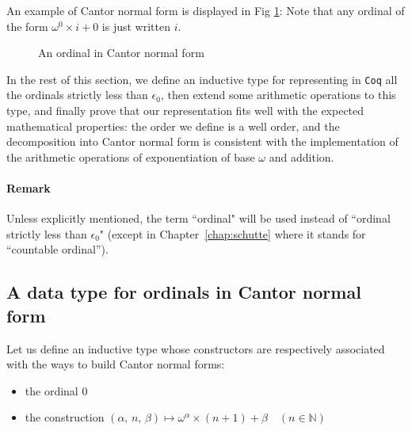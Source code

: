 An example of Cantor normal form is displayed in Fig \ref{fig:cnf-example}:
Note that  any ordinal of
the form \(\omega^0 \times i + 0\) is just written \(i\).

\begin{figure}[htb]
\centering
{}
\caption{\label{fig:cnf-example}
An ordinal in Cantor normal form}
\end{figure}




In the rest of this section, we define an inductive type for representing in \texttt{Coq}
all the ordinals strictly  less than  \(\epsilon_0\), then extend some arithmetic operations
to this type, and finally prove that our representation fits well with 
the expected mathematical properties: the order we define is a well order, 
and the decomposition into Cantor normal form  is consistent 
with the implementation of the arithmetic operations of exponentiation of base \(\omega\) 
and addition.

\paragraph*{Remark}
\label{sec:orgheadline65}
Unless explicitly mentioned, the term ``ordinal" will be used instead of
``ordinal strictly less than \(\epsilon_0\)" (except in Chapter~\ref{chap:schutte} where it stands for ``countable ordinal'').



\subsection{A data type for  ordinals in Cantor normal form}
\label{sec:orgheadline72}
\label{sec:T1-inductive-def}





    Let us define an inductive type whose 
constructors are respectively associated
with the ways to build Cantor normal forms:

\begin{itemize}
\item the ordinal \(0\)
\item the construction \((\alpha,\, n,\,\beta)  \mapsto \omega^\alpha \times (n + 1)+ \beta \quad (n\in\mathbb{N})\)
\end{itemize}


